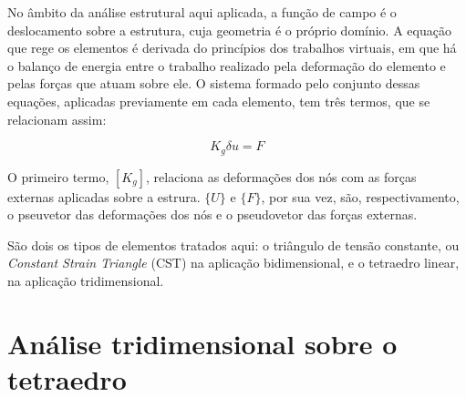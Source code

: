 \begin{figure}
    \label{fig:dominio_triangulo}
\end{figure}

No âmbito da análise estrutural aqui aplicada, a função de campo é o deslocamento sobre a estrutura, cuja geometria é o próprio domínio. A equação que rege os elementos é derivada do princípios dos trabalhos virtuais, em que há o balanço de energia entre o trabalho realizado pela deformação do elemento e pelas forças que atuam sobre ele. O sistema formado pelo conjunto dessas equações, aplicadas previamente em cada elemento, tem três termos, que se relacionam assim:

\begin{equation} \label{eq:sistema_global}
    K_g \delta u = F
\end{equation}

O primeiro termo, $[K_g]$, relaciona as deformações dos nós com as forças externas aplicadas sobre a estrura. $\{U\}$ e $\{F\}$, por sua vez, são, respectivamento, o pseuvetor das deformações dos nós e o pseudovetor das forças externas.

São dois os tipos de elementos tratados aqui: o triângulo de tensão constante, ou \emph{Constant Strain Triangle} (CST) na aplicação bidimensional, e o tetraedro linear, na aplicação tridimensional.

\section{Análise tridimensional sobre o tetraedro}

